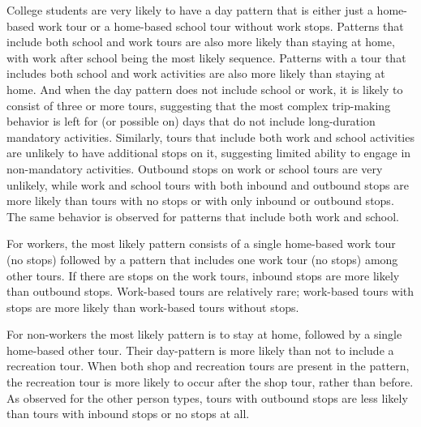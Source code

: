 College students are very likely to have a day pattern that is either just a home-based work tour or a home-based school tour without work stops. Patterns that include both school and work tours are also more likely than staying at home, with work after school being the most likely sequence. Patterns with a tour that includes both school and work activities are also more likely than staying at home. And when the day pattern does not include school or work, it is likely to consist of three or more tours, suggesting that the most complex trip-making behavior is left for (or possible on) days that do not include long-duration mandatory activities. Similarly, tours that include both work and school activities are unlikely to have additional stops on it, suggesting limited ability to engage in non-mandatory activities. Outbound stops on work or school tours are very unlikely, while work and school tours with both inbound and outbound stops are more likely than tours with no stops or with only inbound or outbound stops. The same behavior is observed for patterns that include both work and school.

For workers, the most likely pattern consists of a single home-based work tour (no stops) followed by a pattern that includes one work tour (no stops) among other tours. If there are stops on the work tours, inbound stops are more likely than outbound stops. Work-based tours are relatively rare; work-based tours with stops are more likely than work-based tours without stops.

For non-workers the most likely pattern is to stay at home, followed by a single home-based other tour. Their day-pattern is more likely than not to include a recreation tour. When both shop and recreation tours are present in the pattern, the recreation tour is more likely to occur after the shop tour, rather than before. As observed for the other person types, tours with outbound stops are less likely than tours with inbound stops or no stops at all.

